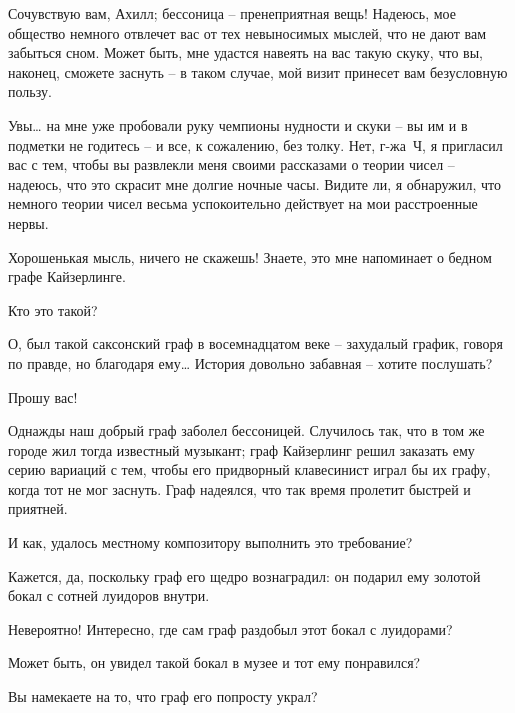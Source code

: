 \documentclass[../main.tex]{subfiles}
\begin{document}


\begin{dialogue}

 Сочувствую вам, Ахилл; бессоница \--- пренеприятная вещь! Надеюсь, мое общество немного отвлечет вас от тех невыносимых мыслей, что не дают вам забыться сном. Может быть, мне удастся навеять на вас такую скуку, что вы, наконец, сможете заснуть \--- в таком случае, мой визит принесет вам безусловную пользу.

 Увы\ldots{} на мне уже пробовали руку чемпионы нудности и скуки \--- вы им и в подметки не годитесь \--- и все, к сожалению, без толку. Нет, г-жа~Ч, я пригласил вас с тем, чтобы вы развлекли меня своими рассказами о теории чисел \--- надеюсь, что это скрасит мне долгие ночные часы. Видите ли, я обнаружил, что немного теории чисел весьма успокоительно действует на мои расстроенные нервы.

 Хорошенькая мысль, ничего не скажешь! Знаете, это мне напоминает о бедном графе Кайзерлинге.

 Кто это такой?

 О, был такой саксонский граф в восемнадцатом веке \--- захудалый график, говоря по правде, но благодаря ему\ldots{} История довольно забавная \--- хотите послушать?

 Прошу вас!

 Однажды наш добрый граф заболел бессоницей. Случилось так, что в том же городе жил тогда известный музыкант; граф Кайзерлинг решил заказать ему серию вариаций с тем, чтобы его придворный клавесинист играл бы их графу, когда тот не мог заснуть. Граф надеялся, что так время пролетит быстрей и приятней.

 И как, удалось местному композитору выполнить это требование?

 Кажется, да, поскольку граф его щедро вознаградил: он подарил ему золотой бокал с сотней луидоров внутри.

 Невероятно! Интересно, где сам граф раздобыл этот бокал с луидорами?

 Может быть, он увидел такой бокал в музее и тот ему понравился?

 Вы намекаете на то, что граф его попросту украл?


\end{dialogue}
\end{document}
